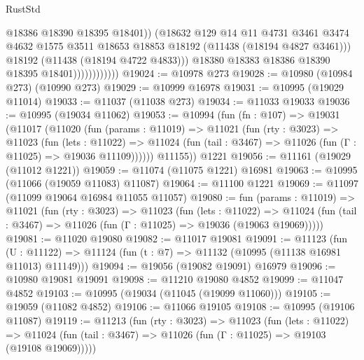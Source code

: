 \begin{lexlean}{RustStd}
\begin{coremodule}
                                  @18386
                                  @18390
                                  @18395
                                  @18401))
                              (@18632
                                @129
                                @14
                                @11
                                @4731
                                @3461
                                @3474
                                @4632
                                @1575
                                @3511
                                @18653
                                @18853
                                @18192
                                (@11438 (@18194 @4827 @3461)))
                              @18192
                              (@11438 (@18194 @4722 @4833)))
                            @18380
                            @18383
                            @18386
                            @18390
                            @18395
                            @18401))))))))))))
@19024 := @10978 @273
@19028 := @10980 (@10984 @273) (@10990 @273)
@19029 := @10999 @16978
@19031 := @10995 (@19029 @11014)
@19033 := @11037 (@11038 @273)
@19034 := @11033 @19033
@19036 := @10995 (@19034 @11062)
@19053 := @10994
    (fun (fn : @107) =>
    @19031
      (@11017
        (@11020
          (fun (params : @11019) =>
          @11021
            (fun (rty : @3023) =>
            @11023
              (fun (lets : @11022) =>
              @11024 (fun (tail : @3467) => @11026 (fun (Γ : @11025) => @19036 @11109))))))
        @11155))
    @1221
@19056 := @11161 (@19029 (@11012 @1221))
@19059 := @11074 (@11075 @1221) @16981
@19063 := @10995 (@11066 (@19059 @11083) @11087)
@19064 := @11100 @1221
@19069 := @11097 (@11099 @19064 @16984 @11055 @11057)
@19080 := fun (params : @11019) =>
  @11021
    (fun (rty : @3023) =>
    @11023
      (fun (lets : @11022) =>
      @11024 (fun (tail : @3467) => @11026 (fun (Γ : @11025) => @19036 (@19063 @19069)))))
@19081 := @11020 @19080
@19082 := @11017 @19081
@19091 := @11123
    (fun (U : @11122) => @11124 (fun (t : @7) => @11132 (@10995 (@11138 @16981 @11013) @11149)))
@19094 := @19056 (@19082 @19091) @16979
@19096 := @10980 @19081 @19091
@19098 := @11210 @19080 @4852
@19099 := @11047 @4852
@19103 := @10995 (@19034 (@11045 (@19099 @11060)))
@19105 := @19059 (@11082 @4852)
@19106 := @11066 @19105
@19108 := @10995 (@19106 @11087)
@19119 := @11213
    (fun (rty : @3023) =>
    @11023
      (fun (lets : @11022) =>
      @11024 (fun (tail : @3467) => @11026 (fun (Γ : @11025) => @19103 (@19108 @19069)))))

\end{coremodule}
\end{lexlean}
